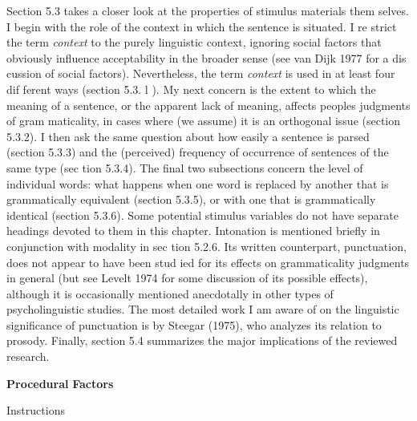 \clearpage\setcounter{page}{1}\begin{styleTextbody}
Section 5.3 takes a closer look at the properties of stimulus materials them\- selves. I begin with the role of the context in which the sentence is situated. I re\- strict the term \textit{context }to the purely linguistic context, ignoring social factors that obviously influence acceptability in the broader sense (see van Dijk 1977 for a dis\- cussion of social factors). Nevertheless, the term \textit{context}\textit{ }is used in at least four dif\- ferent ways (section 5.3. l ). My next concern is the extent to which the meaning of a sentence, or the apparent lack of meaning, affects people{\textquotesingle}s judgments of gram\- maticality, in cases where (we assume) it is an orthogonal issue (section 5.3.2). I then ask the same question about how easily a sentence is parsed (section 5.3.3) and the (perceived) frequency of occurrence of sentences of the same type (sec\- tion 5.3.4). The final two subsections concern the level of individual words: what happens when one word is replaced by another that is grammatically equivalent (section 5.3.5), or with one that is grammatically identical (section 5.3.6). Some potential stimulus variables do not have separate headings devoted to them in this chapter. Intonation is mentioned briefly in conjunction with modality in sec\- tion 5.2.6. Its written counterpart, punctuation, does not appear to have been stud\- ied for its effects on grammaticality judgments in general (but see Levelt 1974 for some discussion of its possible effects), although it is occasionally mentioned anecdotally in other types of psycholinguistic studies. The most detailed work I am aware of on the linguistic significance of punctuation is by Steegar (1975), who analyzes its relation to prosody. Finally, section 5.4 summarizes the major implications of the reviewed research.
\end{styleTextbody}


\begin{styleStandard}
\textbf{Procedural}\textbf{ }\textbf{Factors}
\end{styleStandard}


\begin{styleHeadingviii}
Instructions
\end{styleHeadingviii}


